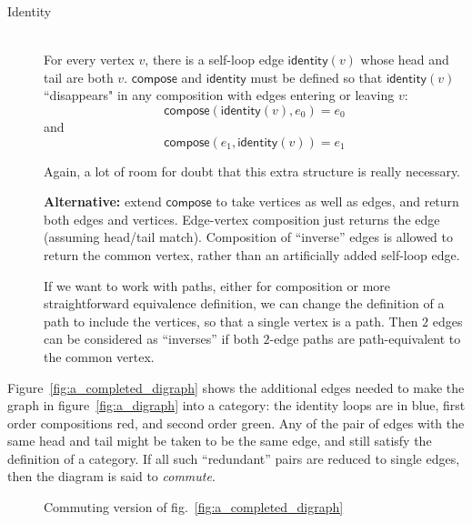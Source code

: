 \documentclass[11pt,openany]{article}
\begin{document}
\begin{description}
\item[Identity]\mbox{}\\
For every vertex $v$, there is a self-loop edge 
$\mathsf{identity}(v)$ whose head and tail
are both $v$.
$\mathsf{compose}$ and $\mathsf{identity}$
must be defined so that  $\mathsf{identity}(v)$ 
``disappears" in any composition with edges 
entering or leaving $v$:
\[ \mathsf{compose}(\mathsf{identity}(v),e_0) = e_0 \]
and
\[ \mathsf{compose}(e_1,\mathsf{identity}(v)) = e_1 \]
\par
Again, a lot of room for doubt that this extra structure is really necessary.
\par
\textbf{Alternative:} 
extend $\mathsf{compose}$ to take vertices as well as edges,
and return both edges and vertices.
Edge-vertex composition just returns the edge (assuming head/tail match).
Composition of ``inverse'' edges is allowed to return the common vertex,
rather than an artificially added self-loop edge.
\par
If we want to work with paths, either for composition
or more straightforward equivalence definition,
we can change the definition of a path to include the vertices,
so that a single vertex is a path. 
Then $2$ edges can be considered as ``inverses'' if both
$2$-edge paths are path-equivalent to the common vertex.
\end{description}

Figure~\ref{fig:a_completed_digraph} shows the additional
edges needed to make the graph in figure~\ref{fig:a_digraph}
into a category: the identity loops are in blue, first order
compositions red, and second order green.
Any of the pair of edges with the same head and tail might be
taken to be the same edge, and still satisfy the definition of a
category. 
If all such ``redundant'' pairs are reduced to single edges,
then the diagram is said to \textit{commute}.

\begin{figure}
\centering
{}
\caption{Commuting version of fig.~\ref{fig:a_completed_digraph}}
\label{fig:a_commuting_diagram}
\end{figure}
\end{document}
